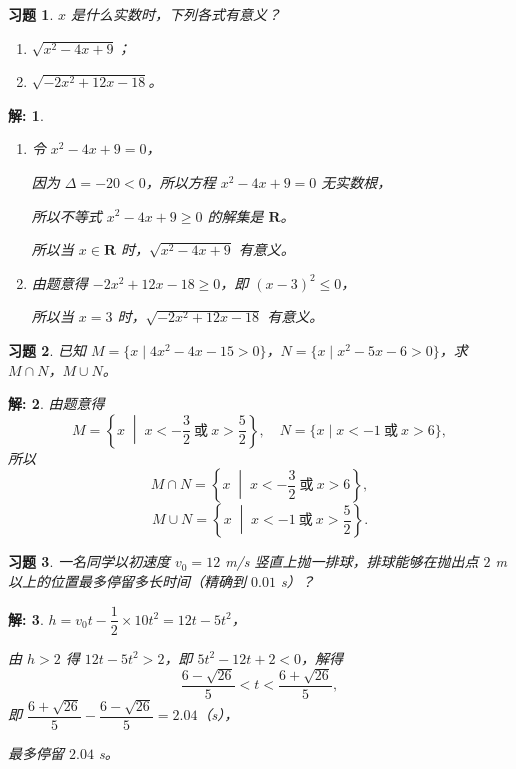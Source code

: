 \documentclass[aspectratio=169,13pt,fleqn,t] {beamer}
\newtheorem*{solve}{解:}
\newtheorem{exercise}{习题}
\begin{document}
\begin{frame}
	\begin{exercise}
	 $x$ 是什么实数时，下列各式有意义？
	\begin{enumerate}[(1)]
		\item $\sqrt{x^2-4x+9}$；
		\item $\sqrt{-2x^2+12x-18}$。
	\end{enumerate}

	\end{exercise}
	
	\begin{solve}
		\begin{enumerate}[(1)]
			\item 令 $x^2-4x+9=0$，
			
			因为 $\Delta=-20<0$，所以方程 $x^2-4x+9=0$ 无实数根，
			
			所以不等式 $x^2-4x+9\geq 0$ 的解集是 $\mathbf{R}$。
			
			所以当 $x\in\mathbf{R}$ 时，$\sqrt{x^2-4x+9}$ 有意义。
			\item 由题意得 $-2x^2+12x-18\geq 0$，即 $(x-3)^2\leq 0$，
			
			所以当 $x=3$ 时，$\sqrt{-2x^2+12x-18}$ 有意义。
		\end{enumerate}
		
	\end{solve}
\end{frame}

\begin{frame}
	\begin{exercise}
		已知 $M=\{x\mid 4x^2-4x-15>0\}$，$N=\{x\mid x^2-5x-6>0\}$，求 $M\cap N$，$M\cup N$。
	\end{exercise}
	
	\begin{solve}
		由题意得
	\[
	M=\left\{x\;\middle|\;x<-\frac{3}{2}\ \text{或}\ x>\frac{5}{2}\right\},\quad
	N=\{x\mid x<-1\ \text{或}\ x>6\},
	\]
	所以
	\[
	M\cap N=\left\{x\;\middle|\;x<-\frac{3}{2}\ \text{或}\ x>6\right\},
	\]
	\[
	M\cup N=\left\{x\;\middle|\;x<-1\ \text{或}\ x>\frac{5}{2}\right\}.
	\]
	\end{solve}
\end{frame}

\begin{frame}
	\begin{exercise}
	一名同学以初速度 $v_0=12$ m/s 竖直上抛一排球，排球能够在抛出点 $2$ m 以上的位置最多停留多长时间（精确到 $0.01$ s）？
	\end{exercise}
	
	\begin{solve}
		$h=v_0 t-\dfrac{1}{2}\times 10t^2=12t-5t^2$，
		
		由 $h>2$ 得 $12t-5t^2>2$，即 $5t^2-12t+2<0$，解得
		\vspace{3pt}
		\[
		\frac{6-\sqrt{26}}{5}<t<\frac{6+\sqrt{26}}{5},
		\]
		\addvspace{5pt}
		即 $\dfrac{6+\sqrt{26}}{5}-\dfrac{6-\sqrt{26}}{5}=2.04$（s），
		
		最多停留 $2.04$ s。
	\end{solve}
\end{frame}
\end{document}
